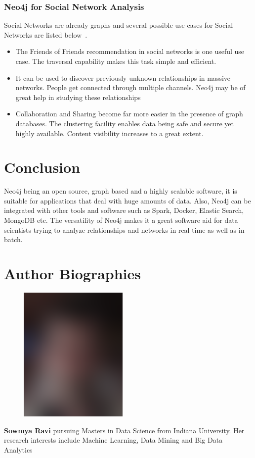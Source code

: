 \documentclass[9pt,twocolumn,twoside]{../../styles/osajnl}
\begin{document}
\subsubsection{Neo4j for Social Network Analysis}
Social Networks are already graphs and several possible use cases for Social Networks are listed below~\cite{www-neo4j-uc2}.
\begin{itemize}
    \item The Friends of Friends recommendation in social networks is one useful use case. The traversal capability makes this task simple and efficient. 
    \item It can be used to discover previously unknown relationships in massive networks. People get connected through multiple channels. Neo4j may be of great help in studying these relationships
    \item Collaboration and Sharing become far more easier in the presence of graph databases. The clustering facility enables data being safe and secure yet highly available. Content visibility increases to a great extent. 
\end{itemize}

\section{Conclusion}
Neo4j being an open source, graph based and a highly scalable software, it is suitable for applications that deal with huge amounts of data. Also, Neo4j can be integrated with other tools and software such as Spark, Docker, Elastic Search, MongoDB etc. The versatility of Neo4j makes it a great software aid for data scientists trying to analyze relationships and networks in real time as well as in batch. 




 
\section*{Author Biographies}
\begingroup
\setlength\intextsep{0pt}
\begin{minipage}[t][3.2cm][t]{1.0\columnwidth} %
  \begin{figure}
    \includegraphics[width=0.25\columnwidth]{images/john_smith.eps}
  \end{figure}
  \noindent
  {\bfseries Sowmya Ravi} pursuing Masters in Data Science from Indiana University. Her research interests include Machine Learning, Data Mining and Big Data Analytics
\end{minipage}

\endgroup

\newpage

\appendix
\end{document}
